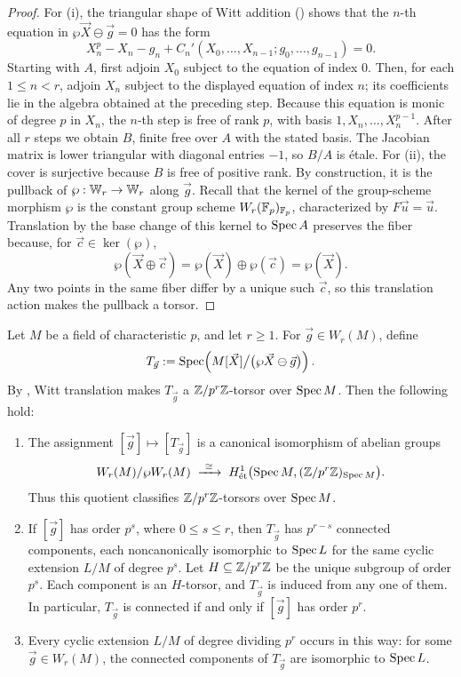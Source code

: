 \begin{proof}
For (i), the triangular shape of Witt addition
() shows that the $n$-th equation in
$\wp\vec X\ominus\vec g=0$ has the form
\[
X_n^p-X_n-g_n+C_n'(X_0,\dots,X_{n-1};g_0,\dots,g_{n-1})=0.
\]
Starting with $A$, first adjoin $X_0$ subject to the equation of index $0$.
Then, for each $1\leq n<r$, adjoin $X_n$ subject to the displayed equation
of index $n$; its coefficients lie in the algebra obtained at the preceding
step. Because this equation is monic of degree $p$ in $X_n$, the $n$-th step
is free of rank $p$, with basis $1,X_n,\dots,X_n^{p-1}$. After all $r$ steps
we obtain $B$, finite free over $A$ with the stated basis. The Jacobian matrix
is lower triangular with diagonal entries $-1$, so $B/A$ is \'etale.
For (ii), the cover is surjective because $B$ is free of positive rank.
By construction, it is the pullback of $\wp:\mathbb{W}_r\to\mathbb{W}_r$ along
$\vec g$. Recall that the kernel of
the group-scheme morphism $\wp$ is the constant group scheme
$W_r(\mathbb{F}_p)_{\mathbb{F}_p}$, characterized by $F\vec u=\vec u$. Translation by the
base change of this kernel to $\operatorname{Spec} A$ preserves the fiber because, for
$\vec c\in\ker(\wp)$,
\[
\wp(\vec X\oplus\vec c)=\wp(\vec X)\oplus\wp(\vec c)=\wp(\vec X).
\]
Any two points in the same fiber differ by a unique such $\vec c$, so this
translation action makes the pullback a torsor.
\end{proof}

\begin{theorem}
\label{theorem:asw_theory}
Let $M$ be a field of characteristic $p$, and let $r\geq1$. For
$\vec g\in W_r(M)$, define
\[
T_{\vec g}:=
\operatorname{Spec}\!\left(M[\vec X]\big/\bigl(\wp\vec X\ominus\vec g\bigr)\right).
\]
By , Witt translation makes $T_{\vec g}$ a
$\mathbb{Z}/p^r\mathbb{Z}$-torsor over $\operatorname{Spec} M$. Then the following hold:
\begin{enumerate}[label=(\roman*)]
\item The assignment
$[\vec g]\mapsto[T_{\vec g}]$ is a canonical isomorphism of abelian groups
\[
W_r(M)/\wp W_r(M)\;\xrightarrow{\ \cong\ }\;
H^1_{\mathrm{\acute et}}
\bigl(\operatorname{Spec} M,(\mathbb{Z}/p^r\mathbb{Z})_{\operatorname{Spec} M}\bigr).
\]
Thus this quotient classifies $\mathbb{Z}/p^r\mathbb{Z}$-torsors over $\operatorname{Spec} M$.

\item If $[\vec g]$ has order $p^s$, where $0\leq s\leq r$, then $T_{\vec g}$
has $p^{r-s}$ connected components, each noncanonically isomorphic to
$\operatorname{Spec} L$ for the same cyclic extension $L/M$ of degree $p^s$.
Let $H\subseteq\mathbb{Z}/p^r\mathbb{Z}$ be the unique subgroup of order $p^s$.
Each component is an $H$-torsor, and $T_{\vec g}$ is induced from any one
of them. In particular, $T_{\vec g}$ is connected if and only if
$[\vec g]$ has order $p^r$.
\item Every cyclic extension $L/M$ of degree dividing $p^r$ occurs in
this way: for some $\vec g\in W_r(M)$, the connected components of
$T_{\vec g}$ are isomorphic to $\operatorname{Spec} L$.
\end{enumerate}
\end{theorem}

